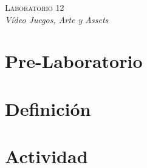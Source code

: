 \begin{center}
\textsc{\Large Laboratorio 12}~\\
\emph{\large Vídeo Juegos, Arte y Assets}
\end{center}

\section{Pre-Laboratorio}

\section{Definición}


\section{Actividad}
